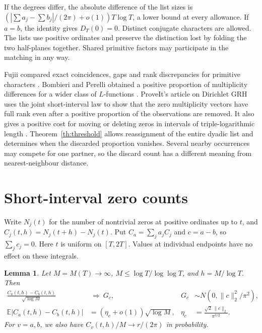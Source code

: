 \documentclass[11pt]{article}
\newtheorem{lemma}[theorem]{Lemma}
\newcommand{\E}{\mathbb E}
\newcommand{\norm}[1]{\lVert#1\rVert}
\begin{document}
If the degrees differ, the absolute difference of the list sizes is
\((|\sum a_j-\sum b_j|/(2\pi)+o(1))T\log T\), a lower bound at every
allowance. If \(a=b\), the identity gives \(D_T(0)=0\). Distinct conjugate
characters are allowed. The lists use positive ordinates and preserve the
distinction lost by folding the two half-planes together. Shared primitive
factors may participate in the matching in any way.

Fujii compared exact coincidences, gaps and rank discrepancies
for primitive characters \cite{fujii}. Bombieri and Perelli obtained a
positive proportion of multiplicity differences for a wider class of
\(L\)-functions \cite[Theorem 1]{bp}. ProveIt's article on Dirichlet GRH
uses the joint short-interval law to show that the zero multiplicity vectors have
full rank even after a positive proportion of the observations are removed.
It also gives a positive cost for moving or deleting zeros in intervals of
triple-logarithmic length \cite{repo}. Theorem~\ref{th:threshold} allows
reassignment of the entire dyadic list and determines when the discarded
proportion vanishes. Several nearby occurrences may compete for one partner,
so the discard count has a different meaning from nearest-neighbour distance.

\section{Short-interval zero counts}

Write \(N_j(t)\) for the number of nontrivial zeros at positive ordinates up to
\(t\), and \(C_j(t,h)=N_j(t+h)-N_j(t)\). Put \(C_a=\sum_j a_j C_j\)
and \(c=a-b\), so \(\sum_j c_j=0\).
Here \(t\) is uniform on \([T,2T]\). Values at individual endpoints have no
effect on these integrals.

\begin{lemma}\label{lem:CLT}
Let \(M=M(T)\to\infty\), \(M\le \log T/\log\log T\), and \(h=M/\log T\).
Then
\begin{align}
 \frac{C_a(t,h)-C_b(t,h)}{\sqrt{\log M}}
 &\ \Longrightarrow\ G_c, &
 G_c&\sim N(0,\norm c_2^2/\pi^2),\label{eq:clt}\\
 \E|C_a(t,h)-C_b(t,h)|
 &= (\eta_c+o(1))\sqrt{\log M},&
 \eta_c&=\frac{\sqrt2\,\norm c_2}{\pi^{3/2}}.\label{eq:L1}
\end{align}
For \(v=a,b\), we also have \(C_v(t,h)/M\to r/(2\pi)\) in probability.
\end{lemma}
\end{document}
